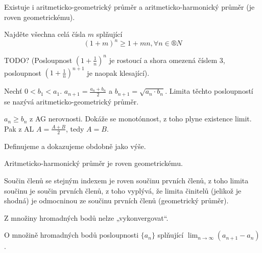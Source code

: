 \documentclass[12pt]{article}					%
\begin{document}
    \begin{poznamka}[2. referát]
        Existuje i aritmeticko-geometrický průměr a aritmeticko-harmonický průměr (je roven geometrickému).
    \end{poznamka}

    \begin{priklad}[3. teoretický]
        Najděte všechna celá čísla $m$ splňující
        $$ (1+m)^n ≥ 1+mn, \forall n \in ®N $$ 
    \end{priklad}
    
    TODO? (Posloupnost $(1+\frac{1}{n})^n$ je rostoucí a shora omezená číslem 3, posloupnost $(1+\frac{1}{n})^{n+1}$ je naopak klesající).


    \begin{definice}
        Nechť $0 < b_1 < a_1$. $a_{n+1} = \frac{a_n + b_n}{2}$ a $b_{n+1} = \sqrt{a_n·b_n}$. Limita těchto posloupností se nazývá aritmeticko-geometrický průměr.

        \begin{dukazin}
            $a_n ≥ b_n$ z AG nerovnosti. Dokáže se monotónnost, z toho plyne existence limit. Pak z AL $A = \frac{A+B}{2}$, tedy $A = B$.
        \end{dukazin}
    \end{definice}

    \begin{definice}
        Definujeme a dokazujeme obdobně jako výše.
    \end{definice}

    \begin{veta}
        Aritmeticko-harmonický průměr je roven geometrickému.
        \begin{dukazin}
            Součin členů se stejným indexem je roven součinu prvních členů, z toho limita součinu je součin prvních členů, z toho vyplývá, že limita činitelů (jelikož je shodná) je odmocninou ze součinu prvních členů (geometrický průměr).
        \end{dukazin}
    \end{veta}

    \begin{veta}[Referáty]
        Z množiny hromadných bodů nelze „vykonvergovat“.

        O množině hromadných bodů posloupnosti $\{a_n\}$ splňující $\lim_{n \rightarrow ∞} (a_{n+1} - a_n)$.
    \end{veta}
\end{document}
